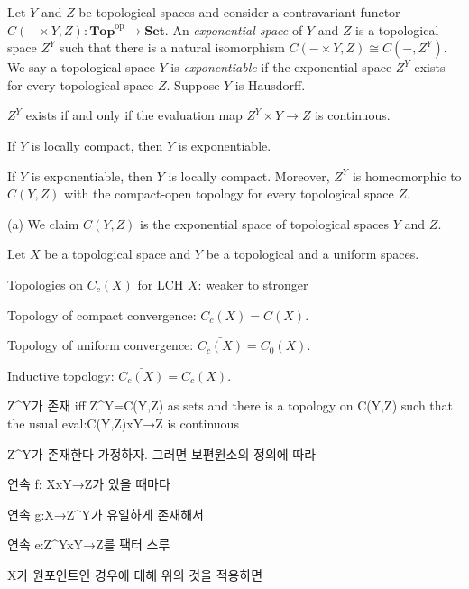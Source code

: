 \documentclass{../../large}
\begin{document}
\begin{prb}
Let $Y$ and $Z$ be topological spaces and consider a contravariant functor $C(-\times Y,Z):\mathbf{Top}^{\mathrm{op}}\to\mathbf{Set}$.
An \emph{exponential space} of $Y$ and $Z$ is a topological space $Z^Y$ such that there is a natural isomorphism $C(-\times Y,Z)\cong C(-,Z^Y)$.
We say a topological space $Y$ is \emph{exponentiable} if the exponential space $Z^Y$ exists for every topological space $Z$.
Suppose $Y$ is Hausdorff.
\begin{parts}
\item
$Z^Y$ exists if and only if the evaluation map $Z^Y\times Y\to Z$ is continuous.
\item
If $Y$ is locally compact, then $Y$ is exponentiable.
\item
If $Y$ is exponentiable, then $Y$ is locally compact.
Moreover, $Z^Y$ is homeomorphic to $C(Y,Z)$ with the compact-open topology for every topological space $Z$.
\end{parts}
\end{prb}
\begin{pf}
(a)
We claim $C(Y,Z)$ is the exponential space of topological spaces $Y$ and $Z$.

\end{pf}


\begin{prb}
Let $X$ be a topological space and $Y$ be a topological and a uniform spaces.
\end{prb}

Topologies on $C_c(X)$ for LCH $X$: weaker to stronger
\begin{parts}
\item Topology of compact convergence: $\bar{C_c(X)}=C(X)$.
\item Topology of uniform convergence: $\bar{C_c(X)}=C_0(X)$.
\item Inductive topology: $\bar{C_c(X)}=C_c(X)$.
\end{parts}


\iffalse
Z^Y가 존재 iff Z^Y=C(Y,Z) as sets and there is a topology on C(Y,Z) such that the usual eval:C(Y,Z)xY→Z is continuous

Z^Y가 존재한다 가정하자. 그러면 보편원소의 정의에 따라

연속 f: XxY→Z가 있을 때마다

연속 g:X→Z^Y가 유일하게 존재해서

연속 e:Z^YxY→Z를 팩터 스루

X가 원포인트인 경우에 대해 위의 것을 적용하면
\end{document}
